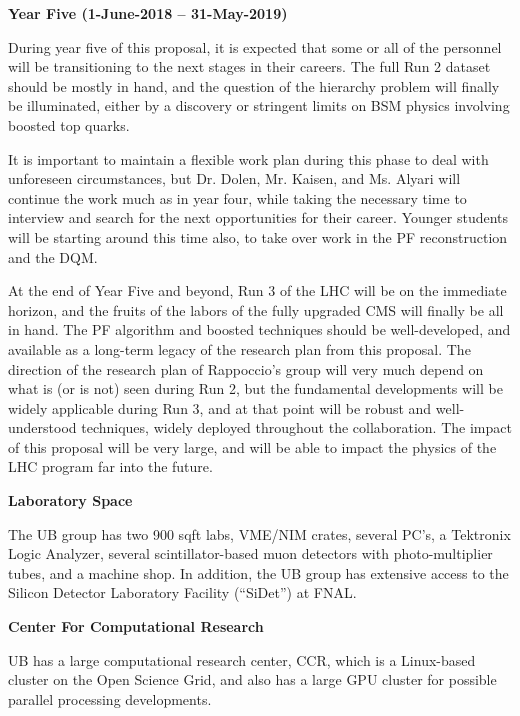 \documentclass[12pt]{proposalnsf}
\begin{document}
\bigskip
\bigskip
{\bf \Large Year Five (1-June-2018 -- 31-May-2019)}
\bigskip


During year five of this proposal, it is expected that some or all of
the personnel will be transitioning to the next stages in their
careers. The full Run 2 dataset should be mostly in hand, and the
question of the hierarchy problem will finally be
illuminated, either by a discovery or stringent limits on BSM
physics involving boosted top quarks. 

It is important to maintain a flexible work plan during this 
phase to deal with unforeseen circumstances, but Dr. Dolen,
Mr. Kaisen, and Ms. Alyari will continue the work much as in year
four, while taking the necessary time to interview and search for the
next opportunities for their career. Younger students will be
starting around this time also, to take over work in the PF
reconstruction and the DQM. 


At the end of Year Five and beyond, Run 3 of the LHC will be on the
immediate horizon, and the fruits of the labors of the fully upgraded
CMS will finally be all in hand. The PF algorithm and boosted
techniques should be well-developed, and available as a long-term
legacy of the research plan from this proposal. The direction of the
research plan of Rappoccio's group will very much depend on what is
(or is not) seen during Run 2, but the fundamental developments will
be widely applicable during Run 3, and at that point will be robust
and well-understood techniques, widely deployed throughout the
collaboration. The impact of this proposal will be very large, and
will be able to impact the physics of the LHC program far into the
future. 

\newpage
{}
\renewcommand{\thepage} {C--\arabic{page}}

\bigskip
{\bf Laboratory Space}

The UB group has two 900 sqft labs, VME/NIM crates,
several PC's, a Tektronix Logic Analyzer, several scintillator-based
muon detectors with photo-multiplier tubes, and a machine shop. 
In addition, the UB group has extensive access to the Silicon
Detector Laboratory Facility (``SiDet'') at FNAL. 

\bigskip
{\bf Center For Computational Research}

UB has a large computational research center, CCR, which is a
Linux-based cluster on the Open Science Grid, and also has a large GPU
cluster for possible parallel processing developments. 
\end{document}
